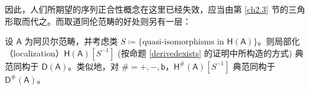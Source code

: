 
因此，人们所期望的序列正合性概念在这里已经失效，应当由第 \ref{ch2.3} 节的三角形取而代之。而取道同伦范畴的好处则另有一层：

\begin{Thm}
	设 $\mathsf{A}$ 为阿贝尔范畴，并考虑类 $S\coloneqq\{\text{quasi-isomorphisms in }\mathsf{H(A)}\}$。则局部化（localization）$\mathsf{H(A)}[S^{-1}]$ \textup(按命题 \ref{derivedexists} 的证明中所构造的方式\textup) 典范同构于 $\mathsf{D(A)}$。类似地，对 $\#=+,-,\mathsf{b}$，$\mathsf{H^\#\!(A)}[S^{-1}]$ 典范同构于 $\mathsf{D^\#\!(A)}$。
\end{Thm}

